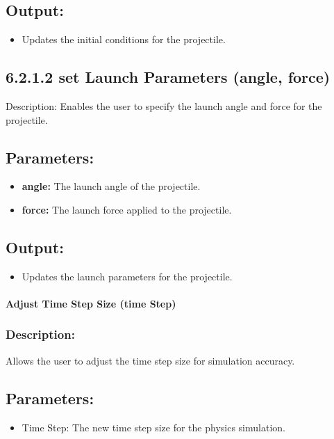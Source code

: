 \documentclass[12pt, titlepage]{article}
\begin{document}
\subsection*{Output:}
\begin{itemize}
  \item Updates the initial conditions for the projectile.
\end{itemize}

\subsection*{6.2.1.2 set Launch Parameters (angle, force)}
Description: Enables the user to specify the launch angle and force for the projectile.

\subsection*{Parameters:}
\begin{itemize}
  \item \textbf{angle:} The launch angle of the projectile.
  \item \textbf{force:} The launch force applied to the projectile.
\end{itemize}

\subsection*{Output:}
\begin{itemize}
  \item Updates the launch parameters for the projectile.
\end{itemize}

\paragraph{Adjust Time Step Size (time Step)}
\subsubsection*{Description:} Allows the user to adjust the time step size for simulation accuracy.

\subsection*{Parameters:}
\begin{itemize}
  \item Time Step: The new time step size for the physics simulation.
\end{itemize}
\end{document}
